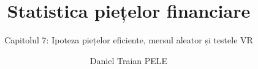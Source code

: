 \title[Statistica piețelor financiare]{Statistica piețelor financiare}
\subtitle{Capitolul 7: Ipoteza piețelor eficiente, mersul aleator și testele VR}
\author[D.T. Pele]{Daniel Traian PELE}
\date{}

\providecommand{\sfmapplink}[3]{\hypertarget{#2}{}\hyperlink{#1}{\beamergotobutton{#3}}}  %
\providecommand{\sfmappback}[2]{\begin{tikzpicture}[remember picture,overlay]\node[anchor=south east] at ([xshift=-3mm,yshift=7mm]current page.south east){\hyperlink{#1}{\beamerreturnbutton{#2}}};\end{tikzpicture}}  %
\providecommand{\sfmchlink}[2]{\href{#1}{#2}}  %
\providecommand{\sfmchlinkt}[2]{\href{#1}{\usebeamercolor[fg]{frametitle}#2}}  %


